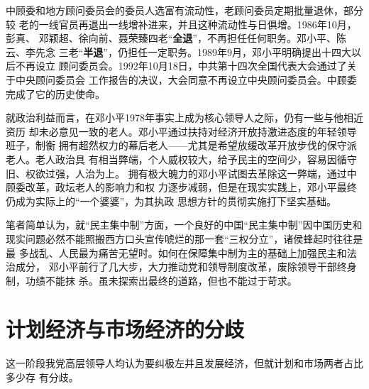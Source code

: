 中顾委和地方顾问委员会的委员人选富有流动性，老顾问委员定期批量退休，部分较
老的一线官员再退出一线增补进来，并且这种流动性与日俱增。1986年10月，彭真、
邓颖超、徐向前、聂荣臻四老“\textbf{全退}”，不再担任任何职务。邓小平、陈云、李先念
三老“\textbf{半退}”，仍担任一定职务。1989年9月，邓小平明确提出十四大以后不再设立
顾问委员会。1992年10月18日，中共第十四次全国代表大会通过了关于中央顾问委员会
工作报告的决议，大会同意不再设立中央顾问委员会。中顾委完成了它的历史使命。

就政治利益而言，在邓小平1978年事实上成为核心领导人之际，仍有一些与他相近资历
却未必意见一致的老人。邓小平通过扶持对经济开放持激进态度的年轻领导班子，制衡
拥有超然权力的幕后老人——尤其是希望放缓改革开放步伐的保守派老人。老人政治具
有相当弊端，个人威权较大，给予民主的空间少，容易因循守旧、权欲过强，人治为上。
拥有极大魄力的邓小平试图去革除这一弊端，通过中顾委改革，政坛老人的影响力和权
力逐步减弱，但是在现实实践上，邓小平最终仍成为实际上的“一个婆婆”，为其执政
思想方针的贯彻实施打下坚实基础。


笔者简单认为，就“民主集中制”方面，一个良好的中国“民主集中制”因中国历史和
现实问题必然不能照搬西方口头宣传唬烂的那一套“三权分立”，诸侯蜂起时往往是最
多战乱、人民最为痛苦无望时。如何在保障集中制为主的基础上加强民主和法治成分，
邓小平前行了几大步，大力推动党和领导制度改革，废除领导干部终身制，功绩不能抹
杀。虽未探索出最终的道路，但也不能过于苛求。

\section{计划经济与市场经济的分歧}




这一阶段我党高层领导人均认为要纠极左并且发展经济，但就计划和市场两者占比多少存
有分歧。

